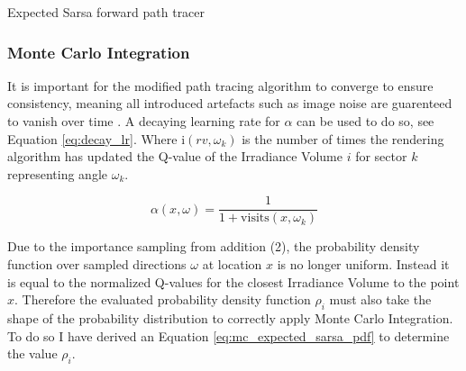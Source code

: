 \documentclass[ %
                    author={Callum Pearce},
                supervisor={Dr. Neill Campbell},
                    degree={MEng},
                     title={How effective are Temporal difference learning methods for reducing the number of zero contribution light paths, while still accurately approximating Global Illumination in Path tracing?},
                  subtitle={},
                      type={research},
                      year={2019} ]{dissertation}
\begin{document}
\begin{algorithm}[H]
\label{alg:expected_sarsa_pathtracer}
\SetAlgoLined
 \caption{Expected Sarsa forward path tracer \cite{dahm2017learning}}
\end{algorithm}

\subsubsection{Monte Carlo Integration}
It is important for the modified path tracing algorithm to converge to ensure consistency, meaning all introduced artefacts such as image noise are guarenteed to vanish over time \cite{dahm2017learning}. A decaying learning rate for $\alpha$ can be used to do so, see Equation \ref{eq:decay_lr}. Where $\text{i}(rv, \omega_k)$ is the number of times the rendering algorithm has updated the Q-value of the Irradiance Volume $i$ for sector $k$ representing angle $\omega_k$.

\begin{equation}
\label{eq:decay_lr}
\alpha(x, \omega) = \frac{1}{1 + \text{visits}(x, \omega_k)}
\end{equation}

Due to the importance sampling from addition (2), the probability density function over sampled directions $\omega$ at location $x$ is no longer uniform. Instead it is equal to the normalized Q-values for the closest Irradiance Volume to the point $x$. Therefore the evaluated probability density function $\rho_i$ must also take the shape of the probability distribution to correctly apply Monte Carlo Integration. To do so I have derived an Equation \ref{eq:mc_expected_sarsa_pdf} to determine the value $\rho_i$.
\end{document}
